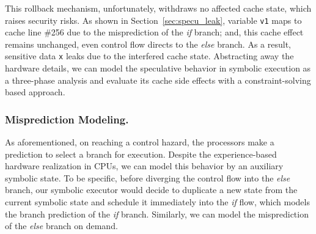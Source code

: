 \documentclass[sigconf,screen]{acmart}
\newcommand\ignore[1]{}
\begin{document}
This rollback mechanism, unfortunately, withdraws no affected cache state, which 
raises security risks. As shown in Section~\ref{sec:specu_leak}, variable \texttt{v1} 
maps to cache line \#256 due to the misprediction of the \textit{if} branch; and, 
this cache effect remains unchanged, even control flow directs to the \textit{else} 
branch. As a result, sensitive data \texttt{x} leaks due to the interfered cache 
state. Abstracting away the hardware details, we can model the speculative behavior 
in symbolic execution as a three-phase analysis and evaluate its cache side effects 
with a constraint-solving based approach. 


\subsubsection{Misprediction Modeling.}
As aforementioned, on reaching a control hazard, the processors make a prediction to
select a branch for execution. Despite the experience-based hardware realization
in CPUs, we can model this behavior by an auxiliary symbolic state. To be specific, 
before diverging the control flow into the \textit{else} branch, our symbolic executor 
would decide to duplicate a new state from the current symbolic state and schedule
it immediately into the \textit{if} flow, which models the branch prediction of the 
\textit{if} branch. Similarly, we can model the misprediction of the \textit{else} 
branch on demand.


\ignore{
Note that we only model speculative execution at branches where both \textit{if} 
and \textit{else} decisions are feasible in terms of the branch conditions. The 
assumption considers the situation where the hazard is dependent on the computation 
over input and cannot be inferred as a \textit{true} or a \textit{false} value in 
advance. In contrast, if the condition is determined to be \textit{true} or 
\textit{false} at the branch point, e.g., the \textit{while} loop head in Figure
\ref{fig:fig2-a}, then the branch decision is deterministic.

However, different program inputs might go through various program paths to reach 
a same branch point but trigger divergent decisions. Thus, in practice speculative 
executions at these points do exist and our method complies with the fact.
}
\end{document}
